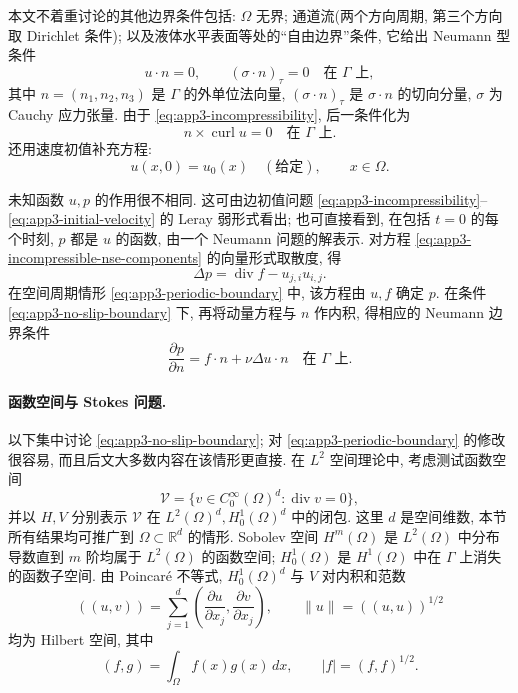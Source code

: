 \hypertarget{appendix-03-page-356}{}
本文不着重讨论的其他边界条件包括: $\Omega$ 无界; 通道流(两个方向周期, 第三个方向取 Dirichlet 条件); 以及液体水平表面等处的``自由边界''条件, 它给出 Neumann 型条件
\[
u\cdot n=0,
\qquad(\sigma\cdot n)_\tau=0
\quad\text{在 }\Gamma\text{ 上},
\]
其中 $n=(n_1,n_2,n_3)$ 是 $\Gamma$ 的外单位法向量, $(\sigma\cdot n)_\tau$ 是 $\sigma\cdot n$ 的切向分量, $\sigma$ 为 Cauchy 应力张量. 由于 
\eqref{eq:app3-incompressibility}, 后一条件化为
\[
n\times\operatorname{curl}u=0
\quad\text{在 }\Gamma\text{ 上}.
\]
还用速度初值补充方程:
\begin{equation}
u(x,0)=u_0(x)\quad(\text{给定}),
\qquad x\in\Omega.
\label{eq:app3-initial-velocity}
\end{equation}

未知函数 $u,p$ 的作用很不相同. 这可由边初值问题 
\eqref{eq:app3-incompressibility}--\eqref{eq:app3-initial-velocity} 的 Leray 弱形式看出; 也可直接看到, 在包括 $t=0$ 的每个时刻, $p$ 都是 $u$ 的函数, 由一个 Neumann 问题的解表示. 对方程 
\eqref{eq:app3-incompressible-nse-components} 的向量形式取散度, 得
\begin{equation}
\Delta p=\operatorname{div}f-u_{j,i}u_{i,j}.
\label{eq:app3-pressure-poisson}
\end{equation}
在空间周期情形 
\eqref{eq:app3-periodic-boundary} 中, 该方程由 $u,f$ 确定 $p$. 在条件 
\eqref{eq:app3-no-slip-boundary} 下, 再将动量方程与 $n$ 作内积, 得相应的 Neumann 边界条件
\begin{equation}
\frac{\partial p}{\partial n}=f\cdot n+\nu\Delta u\cdot n
\quad\text{在 }\Gamma\text{ 上}.
\label{eq:app3-pressure-neumann}
\end{equation}

\paragraph{函数空间与 Stokes 问题.}
以下集中讨论 
\eqref{eq:app3-no-slip-boundary}; 对 
\eqref{eq:app3-periodic-boundary} 的修改很容易, 而且后文大多数内容在该情形更直接. 在 $L^2$ 空间理论中, 考虑测试函数空间
\[
\mathcal V=\{v\in C_0^\infty(\Omega)^d:\operatorname{div}v=0\},
\]
并以 $H,V$ 分别表示 $\mathcal V$ 在 $L^2(\Omega)^d,H_0^1(\Omega)^d$ 中的闭包. 这里 $d$ 是空间维数, 本节所有结果均可推广到 $\Omega\subset\mathbb R^d$ 的情形. Sobolev 空间 $H^m(\Omega)$ 是 $L^2(\Omega)$ 中分布导数直到 $m$ 阶均属于 $L^2(\Omega)$ 的函数空间; $H_0^1(\Omega)$ 是 $H^1(\Omega)$ 中在 $\Gamma$ 上消失的函数子空间. 由 Poincaré 不等式, $H_0^1(\Omega)^d$ 与 $V$ 对内积和范数
\[
((u,v))=\sum_{j=1}^d\left(\frac{\partial u}{\partial x_j},\frac{\partial v}{\partial x_j}\right),
\qquad
\lVert u\rVert=((u,u))^{1/2}
\]
均为 Hilbert 空间, 其中
\[
(f,g)=\int_\Omega f(x)g(x)\,dx,
\qquad |f|=(f,f)^{1/2}.
\]

